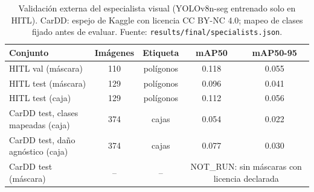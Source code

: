 \begin{table}[H]\centering\footnotesize
\begin{tabular}{lcccc}
\toprule
\textbf{Conjunto} & \textbf{Imágenes} & \textbf{Etiqueta} & \textbf{mAP50} & \textbf{mAP50-95} \\ \midrule
HITL val (máscara) & 110 & polígonos & 0.118 & 0.055 \\
HITL test (máscara) & 129 & polígonos & 0.096 & 0.041 \\
HITL test (caja) & 129 & polígonos & 0.112 & 0.056 \\
CarDD test, clases mapeadas (caja) & 374 & cajas & 0.054 & 0.022 \\
CarDD test, daño agnóstico (caja) & 374 & cajas & 0.077 & 0.030 \\
CarDD test (máscara) & -- & -- & \multicolumn{2}{c}{NOT\_RUN: sin máscaras con licencia declarada} \\
\bottomrule
\end{tabular}
\caption{Validación externa del especialista visual (YOLOv8n-seg entrenado solo en HITL). CarDD: espejo de Kaggle con licencia CC BY-NC 4.0; mapeo de clases fijado antes de evaluar. Fuente: \texttt{results/final/specialists.json}.}
\label{tab:externa}
\end{table}
